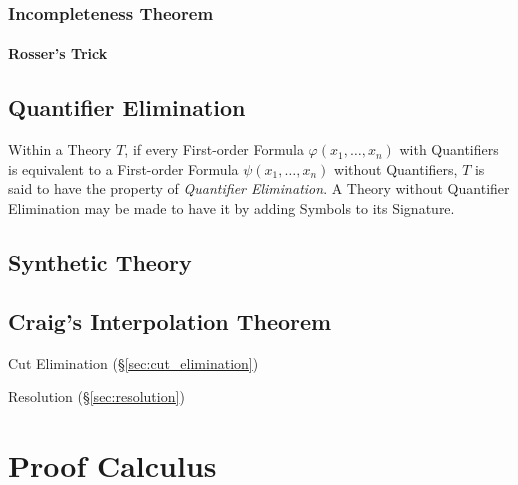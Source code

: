 \subsubsection{Incompleteness Theorem}\label{sec:incompleteness_theorem}

\paragraph{Rosser's Trick}\label{sec:rossers_trick}



\subsection{Quantifier Elimination}\label{sec:quantifier_elimination}

Within a Theory $T$, if every First-order Formula $\varphi(x_1,
\ldots, x_n)$ with Quantifiers is equivalent to a First-order Formula
$\psi(x_1, \ldots, x_n)$ without Quantifiers, $T$ is said to have the
property of \emph{Quantifier Elimination}. A Theory without Quantifier
Elimination may be made to have it by adding Symbols to its Signature.



\subsection{Synthetic Theory}\label{sec:synthetic_theory}

\subsection{Craig's Interpolation Theorem}
\label{sec:interpolation_theorem}

Cut Elimination (\S\ref{sec:cut_elimination})

Resolution (\S\ref{sec:resolution})



\section{Proof Calculus}\label{sec:proof_calculus}

